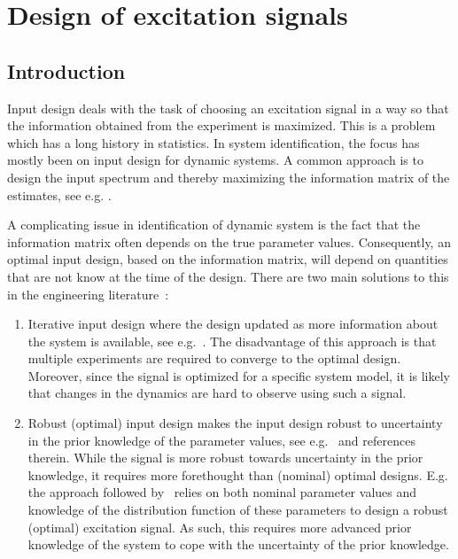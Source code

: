 \chapter{Design of excitation signals}
\label{sec:excitation}
\def\thisDir{ch02-qlogms}

\section{Introduction}
\label{sec:excitation:intro}
Input design deals with the task of choosing an excitation signal in a way so that the information obtained from the experiment is maximized. 
This is a problem which has a long history in statistics. 
In system identification, the focus has mostly been on input design for dynamic systems.
A common approach is to design the input spectrum and thereby maximizing the information matrix of the estimates, see e.g. \citep{Fedorov1972,Goodwin1977}.

A complicating issue in identification of dynamic system is the fact that the information matrix often depends on the true parameter values. 
Consequently, an optimal input design, based on the information matrix, will depend on quantities that are not know at the time of the design.
There are two main solutions to this in the engineering literature~\citep{Goodwin2006GBO}:
\begin{enumerate}
\item Iterative input design where the design updated as more information about the system is available, see e.g.~\citep{Hjalmarsson2005,Gevers2005}.
The disadvantage of this approach is that multiple experiments are required to converge to the optimal design.
Moreover, since the signal is optimized for a specific system model, it is likely that changes in the dynamics are hard to observe using such a signal.

\item Robust (optimal) input design makes the input design robust to uncertainty in the prior knowledge of the parameter values, see e.g.~\citep{Rojas2007,Goodwin2006GBO,Rojas2012} and references therein. 
While the signal is more robust towards uncertainty in the prior knowledge, it requires more forethought than (nominal) optimal designs.
E.g. the approach followed by~\citet{Rojas2007} relies on both nominal parameter values and  knowledge of the distribution function of these parameters to design a robust (optimal) excitation signal.
As such, this requires more advanced prior knowledge of the system to cope with the uncertainty of the prior knowledge.
\end{enumerate}

